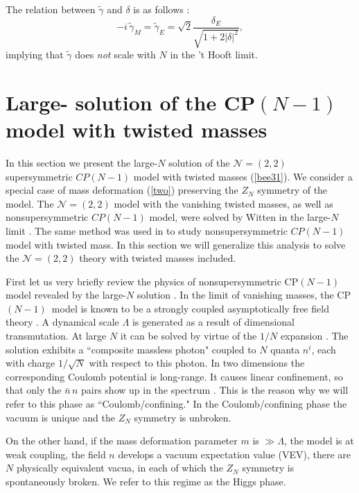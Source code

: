 \documentclass[epsfig,12pt]{article}
\def\beq{\begin{equation}}
\def\eeq{\end{equation}}
\newcommand{\cpn}{CP$(N-1)\,$}
\def\beq{\begin{equation}}
\def\eeq{\end{equation}}
\newcommand{\ntwot}{${\mathcal N}= \left(2,2\right) $ }
\begin{document}
The relation between $\tilde\gamma$ and $\delta$
is as follows \cite{BSY3}:
\beq
-i\,\tilde\gamma_M=\tilde\gamma_E = \sqrt{2} \frac{\delta_E}{\sqrt{1+ 2 |\delta |^2}},
\label{tftpi4}
\eeq
implying that $\tilde \gamma$ does {\em not} scale with $N$ in the 't Hooft limit.





\section{Large- solution
of the \cpn model with twisted masses}
\label{lnscptm}
\setcounter{equation}{0}





In this section we present the large-$N$ solution of the \ntwot supersymmetric $CP(N-1)$ model 
with twisted masses (\ref{bee31}). We consider a special case of mass deformation (\ref{two}) 
preserving the $Z_N$ symmetry of the model. 
The \ntwot  model with the vanishing twisted masses, as well as nonsupersymmetric $CP(N-1)$ model,
were solved by Witten in the large-$N$ limit \cite{W79}.
The same method was used in
\cite{GSYphtr} to study nonsupersymmetric $CP(N-1)$ 
model with twisted mass. In this section we will generalize this analysis 
to solve the \ntwot theory with twisted masses included. 

First let us very briefly review the physics of nonsupersymmetric \cpn model revealed
by the large-$N$ solution \cite{GSYphtr}.
In the limit of vanishing masses, the \mbox{\cpn} model is known to 
be a strongly coupled asymptotically free
field theory
\cite{BelPo}. A dynamical scale $\Lambda$ is generated as a result of
dimensional transmutation.
At large $N$ it can be solved by virtue of the $1/N$ expansion
\cite{W79}.
The solution  exhibits a ``composite massless photon"
coupled to $N$ quanta $n^i$, each with charge $1/\sqrt N$ with respect
to this photon. In two dimensions the corresponding Coulomb potential is long-range.
It causes linear confinement, so that only the $\bar n\,n$ pairs show up in the
spectrum \cite{Coleman,W79}. This is the reason why we will refer to this phase as
``Coulomb/confining." In the Coulomb/confining phase the vacuum 
is unique and the $Z_N$ symmetry is unbroken.

On the other hand, if the mass deformation parameter $m$ is $\gg\Lambda$,
the model is at weak coupling, the field $n$ develops a vacuum
expectation value (VEV),
there are $N$ physically equivalent vacua, in each of which the
$Z_N$ symmetry is spontaneously broken. We  refer to this regime
as the
Higgs phase.
\end{document}
